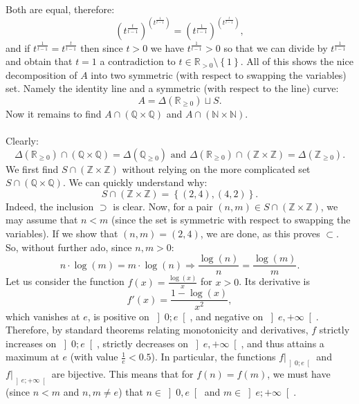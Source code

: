 \begin{solution}
\[    \]
    Both are equal, therefore:
    \[
        \left(t^{\frac{t}{t-1}}\right)^{\left(t^{\frac{1}{t-1}}\right)} = \left(t^{\frac{1}{t-1}}\right)^{\left(t^{\frac{t}{t-1}}\right)},
    \]
    and if \( t^{\frac{1}{t-1}}=t^{\frac{t}{t-1}} \) then since \( t > 0 \) we have \( t^{\frac{1}{t-1}}>0 \) so that we can divide by \( t^{\frac{1}{t-1}} \) and obtain that \( t=1 \) a contradiction to \( t\in\mathbb{R}_{>0}\setminus\left\{1\right\} \). All of this shows the nice decomposition of \( A \) into two symmetric (with respect to swapping the variables) set. Namely the identity line and a symmetric (with respect to the line) curve:
    \[
        A=\Delta\left(\mathbb{R}_{\geq 0}\right) \sqcup S.
    \]
    Now it remains to find \( A\cap\left(\mathbb{Q}\times\mathbb{Q}\right) \) and \( A\cap\left(\mathbb{N}\times\mathbb{N}\right) \).
    \\\\
    Clearly:
    \[
        \Delta\left(\mathbb{R}_{\geq 0}\right)\cap\left(\mathbb{Q}\times\mathbb{Q}\right)=\Delta\left(\mathbb{Q}_{\geq 0}\right)\text{ and } \Delta\left(\mathbb{R}_{\geq 0}\right)\cap\left(\mathbb{Z}\times\mathbb{Z}\right)=\Delta\left(\mathbb{Z}_{\geq 0}\right).
    \]
    We first find \( S \cap \left( \mathbb{Z} \times \mathbb{Z} \right) \) without relying on the more complicated set \( S \cap \left( \mathbb{Q} \times \mathbb{Q} \right) \). We can quickly understand why:
    \[
        S \cap \left( \mathbb{Z} \times \mathbb{Z} \right) = \left\{ \left( 2,4 \right), \left( 4,2 \right) \right\}.
    \]
    Indeed, the inclusion \( \supset \) is clear. Now, for a pair \( \left( n,m \right) \in S \cap \left( \mathbb{Z} \times \mathbb{Z} \right) \), we may assume that \( n < m \) (since the set is symmetric with respect to swapping the variables). If we show that \( \left( n,m \right) = \left( 2,4 \right) \), we are done, as this proves \( \subset \). So, without further ado, since \( n,m > 0 \):
    \[
        n \cdot \log\left( m \right) = m \cdot \log\left( n \right) \Rightarrow \frac{\log\left( n \right)}{n} = \frac{\log\left( m \right)}{m}.
    \]
    Let us consider the function \( f\left( x \right) = \frac{\log\left( x \right)}{x} \) for \( x > 0 \). Its derivative is
    \[
        f'\left( x \right) = \frac{1 - \log\left( x \right)}{x^2},
    \]
    which vanishes at \( e \), is positive on \( \left]0;e\right[ \), and negative on \( \left] e,+\infty \right[ \). Therefore, by standard theorems relating monotonicity and derivatives, \( f \) strictly increases on \( \left]0;e\right[ \), strictly decreases on \( \left] e,+\infty \right[ \), and thus attains a maximum at \( e \) (with value \( \frac{1}{e} < 0.5 \)). In particular, the functions \( f|_{\left]0;e\right[} \) and \( f|_{\left]e;+\infty\right[} \) are bijective. This means that for \( f\left(n\right) = f\left(m\right) \), we must have (since \( n < m \) and \( n,m \neq e \)) that \( n \in \left] 0,e \right[ \) and \( m \in \left]e;+\infty\right[ \).

\end{solution}
